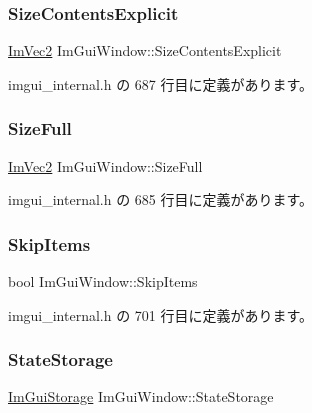 \subsubsection{\texorpdfstring{Size\+Contents\+Explicit}{SizeContentsExplicit}}
{\footnotesize\ttfamily \mbox{\hyperlink{struct_im_vec2}{Im\+Vec2}} Im\+Gui\+Window\+::\+Size\+Contents\+Explicit}



 imgui\+\_\+internal.\+h の 687 行目に定義があります。

\mbox{\label{struct_im_gui_window_ac3c7eb6b9cd556d56210cbb37caf0c74}} 
\subsubsection{\texorpdfstring{Size\+Full}{SizeFull}}
{\footnotesize\ttfamily \mbox{\hyperlink{struct_im_vec2}{Im\+Vec2}} Im\+Gui\+Window\+::\+Size\+Full}



 imgui\+\_\+internal.\+h の 685 行目に定義があります。

\mbox{\label{struct_im_gui_window_ac620c64ec2897561f719db266f5e9b05}} 
\subsubsection{\texorpdfstring{Skip\+Items}{SkipItems}}
{\footnotesize\ttfamily bool Im\+Gui\+Window\+::\+Skip\+Items}



 imgui\+\_\+internal.\+h の 701 行目に定義があります。

\mbox{\label{struct_im_gui_window_a2151ab67f2624bd606883ad346179486}} 
\subsubsection{\texorpdfstring{State\+Storage}{StateStorage}}
{\footnotesize\ttfamily \mbox{\hyperlink{struct_im_gui_storage}{Im\+Gui\+Storage}} Im\+Gui\+Window\+::\+State\+Storage}



